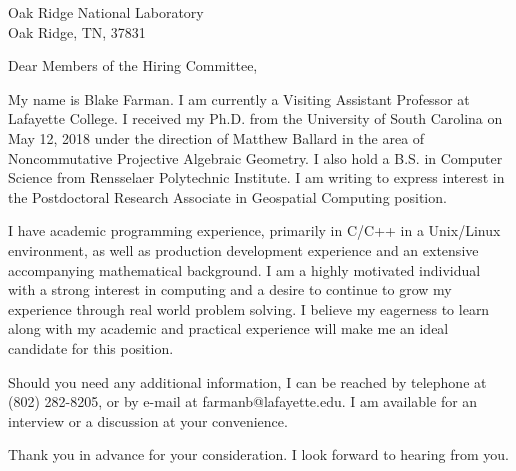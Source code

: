 \documentclass{letter}
\begin{document}
\newcommand{\loc}{MathJobs}
\newcommand{\posting}{Postdoctoral Research Associate in Geospatial Computing position}
\newcommand{\employer}{Oak Ridge National Laboratory\\Oak Ridge, TN, 37831}

\def\materials{}
\begin{letter}{\employer}
  \opening{Dear Members of the Hiring Committee,}
  
  My name is Blake Farman.
  I am currently a Visiting Assistant Professor at Lafayette College.
  I received my Ph.D. from the University of South Carolina on May 12, 2018 under the direction of Matthew Ballard in the area of Noncommutative Projective Algebraic Geometry.
  I also hold a B.S. in Computer Science from Rensselaer Polytechnic Institute.
  I am writing to express interest in the \posting.

  I have academic programming experience, primarily in C/C++ in a Unix/Linux environment, as well as production development experience and an extensive accompanying mathematical background.
  I am a highly motivated individual with a strong interest in computing and a desire to continue to grow my experience through real world problem solving.  
  I believe my eagerness to learn along with my academic and practical experience will make me an ideal candidate for this position.

  Should you need any additional information, I can be reached by telephone at (802) 282-8205, or by e-mail at farmanb@lafayette.edu.  
  I am available for an interview or a discussion at your convenience.  
  
  Thank you in advance for your consideration.
  I look forward to hearing from you.
  


\end{letter}
\end{document}
